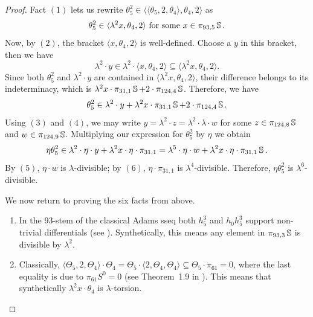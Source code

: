 \begin{proof}
Fact $(1)$ lets us rewrite $\theta_5^2 \in \langle \langle \theta_5, 2, \theta_4 \rangle, \theta_4, 2 \rangle$ as 
$$\theta_5^2 \in \langle \lambda^2 x, \theta_4, 2 \rangle \ \text{for some} \ x \in \pi_{93,5}\operatorname{\mathbb{S}}.$$
Now, by $(2)$, the bracket $\langle x, \theta_4, 2 \rangle$ is well-defined.
Choose a $y$ in this bracket, then we have
$$\lambda^2 \cdot y \in \lambda^2 \cdot \langle x, \theta_4, 2 \rangle \subseteq \langle \lambda^2 x, \theta_4, 2 \rangle.$$
Since both $\theta_5^2$ and $\lambda^2 \cdot y$ are contained in $\langle \lambda^2 x, \theta_4, 2 \rangle$, their difference belongs to its indeterminacy, which is $\lambda^2 x \cdot \pi_{31,1}\operatorname{\mathbb{S}} + 2 \cdot \pi_{124,4}\operatorname{\mathbb{S}}$. Therefore, we have
$$\theta_5^2 \in \lambda^2 \cdot y  + \lambda^2 x \cdot \pi_{31,1}\operatorname{\mathbb{S}} + 2 \cdot \pi_{124,4}\operatorname{\mathbb{S}}.$$
Using $(3)$ and $(4)$, we may write $y = \lambda^2 \cdot z = \lambda^2 \cdot \lambda \cdot w$
for some $z \in \pi_{124,8}\operatorname{\mathbb{S}}$ and $w \in \pi_{124,9}\operatorname{\mathbb{S}}$. 
Multiplying our expression for $\theta_5^2$ by $\eta$ we obtain
$$\eta \theta_5^2 \in \lambda^2 \cdot \eta \cdot y + \lambda^2 x \cdot \eta \cdot \pi_{31,1} =  \lambda^5 \cdot \eta \cdot w + \lambda^2 x \cdot \eta \cdot \pi_{31,1}\operatorname{\mathbb{S}}.$$
By $(5)$, $\eta \cdot w$ is $\lambda$-divisible; by $(6)$, $\eta \cdot \pi_{31, 1}$ is $\lambda^4$-divisible. Therefore, $\eta \theta_5^2$ is $\lambda^6$-divisible. 

We now return to proving the six facts from above.\vspace{4pt}
\begin{enumerate}
\item In the 93-stem of the classical Adams sseq both $h_5^3$ and $h_0 h_5^3$ support non-trivial differentials (see \cite{IWX}).
  Synthetically, this means any element in $\pi_{93,3}\operatorname{\mathbb{S}}$ is divisible by $\lambda^2$.\vspace{4pt}
\item Classically, $\langle \Theta_5, 2, \Theta_4 \rangle \cdot \Theta_4 = \Theta_5 \cdot \langle 2, \Theta_4, \Theta_4 \rangle \subseteq \Theta_5 \cdot \pi_{61} = 0$, where the last equality is due to $\pi_{61}S^0 = 0$ (see Theorem~1.9 in \cite{WX}). This means that synthetically $\lambda^2 x \cdot \theta_4$ is $\lambda$-torsion.


\end{enumerate}
\end{proof}
